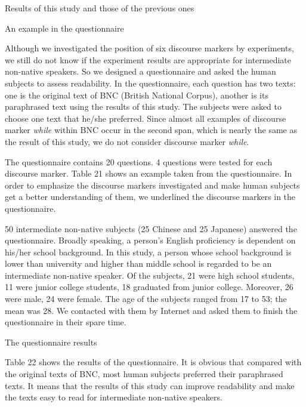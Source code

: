 \documentclass[english]{jnlp_1.3e}
\begin{document}
\begin{table}[b]
\caption{Results of this study and those of the previous ones}

\end{table}
\begin{table}[b]
\caption{An example in the questionnaire}

\end{table}




Although we investigated the position of six discourse markers
by experiments, we still do not know if the experiment 
results are appropriate for intermediate non-native speakers. 
So we designed a questionnaire and asked the human subjects 
to assess readability. In the questionnaire, each question
has two texts: one is the original text of BNC (British National
Corpus), another is its paraphrased text using the results of 
this study. The subjects were asked to choose one text that  
he/she preferred. Since almost all examples of discourse marker \textit{while} 
within BNC occur in the second span, which is nearly the same 
as the result of this study, we do not consider discourse marker 
\textit{while}.

The questionnaire contains 20 questions. 4 questions were tested
for each discourse marker. Table 21 shows an example taken from
the questionnaire. In order to emphasize the discourse markers
investigated and make human subjects get a better understanding
of them, we underlined the discourse markers in the questionnaire.  


50 intermediate non-native subjects (25 Chinese and 25 Japanese) answered the
questionnaire. Broadly speaking, a person's English proficiency is dependent on his/her
school background. In this study, a person whose school background is lower than university
and higher than middle school is regarded to be an intermediate non-native speaker. Of the
subjects, 21 were high school students, 11 were junior college students, 18 graduated from
junior college. Moreover, 26 were male, 24 were female. The age of the 
subjects ranged from 17 to 53; the mean was 28. We contacted with 
them by Internet and asked them to finish the questionnaire in their 
spare time.

\begin{table}[t]
\caption{The questionnaire results}

\end{table}

Table 22 shows the results of the questionnaire. It is obvious that
compared with the original texts of BNC, most human subjects preferred
their paraphrased texts. It means that the results of this study can improve
readability and make the texts easy to read for intermediate non-native speakers.
\end{document}
